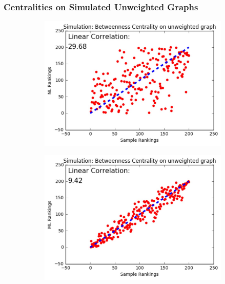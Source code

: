 \documentclass[10pt]{beamer}
\begin{document}
\begin{frame}
\frametitle{Centralities on Simulated Unweighted Graphs}
\vspace{0.15in}
\begin{figure}[H]
\centering
\begin{subfigure}{.32\textwidth}
  \centering
  \includegraphics[width=0.95\linewidth]{BCU_NL.jpeg}
\end{subfigure}
\begin{subfigure}{.32\textwidth}
	\centering
    \includegraphics[width=0.95\linewidth]{BCU_ML.jpeg}
\end{subfigure}
\begin{subfigure}{.32\textwidth}

\end{subfigure}
\end{figure}
\end{frame}
\end{document}

